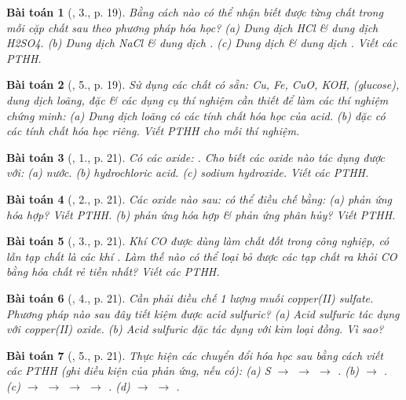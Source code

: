 \documentclass{article}
\newtheorem{baitoan}{Bài toán}
\begin{document}
\begin{baitoan}[\cite{SGK_Hoa_Hoc_9}, 3., p. 19]
	Bằng cách nào có thể nhận biết được từng chất trong mỗi cặp chất sau theo phương pháp hóa học? (a) Dung dịch \emph{HCl} \& dung dịch \emph{H2SO4}. (b) Dung dịch \emph{NaCl} \& dung dịch \emph{}. (c) Dung dịch \emph{} \& dung dịch \emph{}. Viết các PTHH.
\end{baitoan}

\begin{baitoan}[\cite{SGK_Hoa_Hoc_9}, 5., p. 19]
	Sử dụng các chất có sẵn: \emph{Cu, Fe, CuO, KOH, } (glucose), dung dịch \emph{} loãng, \emph{} đặc \& các dụng cụ thí nghiệm cần thiết để làm các thí nghiệm chứng minh: (a) Dung dịch \emph{} loãng có các tính chất hóa học của acid. (b) \emph{} đặc có các tính chất hóa học riêng. Viết PTHH cho mỗi thí nghiệm.
\end{baitoan}

\begin{baitoan}[\cite{SGK_Hoa_Hoc_9}, 1., p. 21]
	Có các oxide: \emph{}. Cho biết các oxide nào tác dụng được với: (a) nước. (b) hydrochloric acid. (c) sodium hydroxide. Viết các PTHH.
\end{baitoan}

\begin{baitoan}[\cite{SGK_Hoa_Hoc_9}, 2., p. 21]
	Các oxide nào sau: \emph{} có thể điều chế bằng: (a) phản ứng hóa hợp? Viết PTHH. (b) phản ứng hóa hợp \& phản ứng phân hủy? Viết PTHH.
\end{baitoan}

\begin{baitoan}[\cite{SGK_Hoa_Hoc_9}, 3., p. 21]
	Khí \emph{CO} được dùng làm chất đốt trong công nghiệp, có lẫn tạp chất là các khí \emph{}. Làm thế nào có thể loại bỏ được các tạp chất ra khỏi \emph{CO} bằng hóa chất rẻ tiền nhất? Viết các PTHH.
\end{baitoan}

\begin{baitoan}[\cite{SGK_Hoa_Hoc_9}, 4., p. 21]
	Cần phải điều chế 1 lượng muối copper(II) sulfate. Phương pháp nào sau đây tiết kiệm được acid sulfuric? (a) Acid sulfuric tác dụng với copper(II) oxide. (b) Acid sulfuric đặc tác dụng với kim loại đồng. Vì sao?
\end{baitoan}

\begin{baitoan}[\cite{SGK_Hoa_Hoc_9}, 5., p. 21]
	Thực hiện các chuyển đổi hóa học sau bằng cách viết các PTHH (ghi điều kiện của phản ứng, nếu có): (a) \emph{S $\to$  $\to$  $\to$ }. (b) \emph{ $\to$ }. (c) \emph{ $\to$  $\to$  $\to$  $\to$ }. (d) \emph{ $\to$  $\to$ }.
\end{baitoan}
\end{document}
